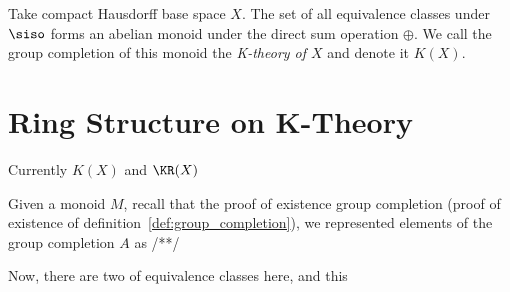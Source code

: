 \documentclass[../sean_thesis.tex]{subfiles}
\begin{document}
\begin{definition}[K-Theory]
	Take compact Hausdorff base space $X$. The set of all equivalence classes under $\siso$ forms an abelian monoid under the direct sum operation $\oplus$. We call the group completion of this monoid the \emph{K-theory of $X$} and denote it $K(X)$. 
\end{definition}

\section{Ring Structure on K-Theory}

Currently $K(X)$ and $\KR(X)$ 

Given a monoid $M$, recall that the proof of existence group completion (proof of existence of definition~\ref{def:group_completion}), we represented elements of the group completion $A$ as /**/

Now, there are two of equivalence classes here, and this 

\begin{claim}
\end{claim}
\end{document}
